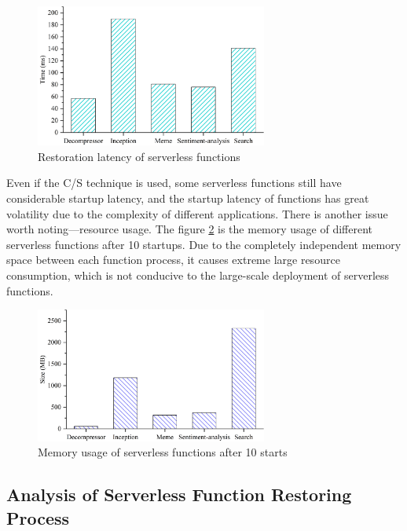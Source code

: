 \begin{figure}[t]
    \centering
    \includegraphics[width=3in]{images/default-restore.png}
    \caption{Restoration latency of serverless functions}
    \label{default-restore}
\end{figure}

Even if the C/S technique is used, some serverless functions still have considerable startup latency, 
and the startup latency of functions has great volatility due to the complexity of different applications. 
There is another issue worth noting—resource usage. 
The figure \ref{restore-mem} is the memory usage of different serverless functions after 10 startups. 
Due to the completely independent memory space between each function process, 
it causes extreme large resource consumption, 
which is not conducive to the large-scale deployment of serverless functions.

\begin{figure}[t]
    \centering
    \includegraphics[width=3in]{images/default-resotre-mem.png}
    \caption{Memory usage of serverless functions after 10 starts}
    \label{restore-mem}
\end{figure}

\subsection{Analysis of Serverless Function Restoring Process}